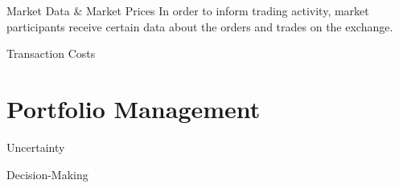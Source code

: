 \documentclass{beamer}
\begin{document}
\begin{frame}{Market Data \& Market Prices}
	In order to inform trading activity, market participants receive certain data about the orders and trades on the exchange.




\end{frame}

\begin{frame}{Transaction Costs}



\end{frame}

\section{Portfolio Management}
\begin{frame}{Uncertainty}
\end{frame}

\begin{frame}{Decision-Making}
\end{frame}
\end{document}
